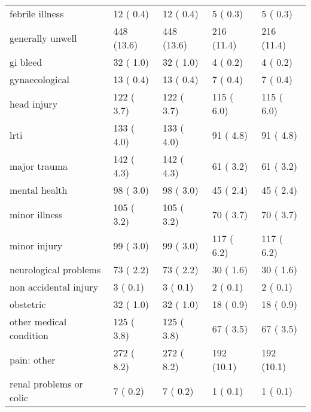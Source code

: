 \documentclass[
  a4paper,
  openany]{article}
\begin{document}
\begin{longtable}[t]{lllll}
\hspace{1em}febrile illness & 12 ( 0.4) & 12 ( 0.4) & 5 ( 0.3) & 5 ( 0.3)\\
\rowcolor{gray!6}  \hspace{1em}generally unwell & 448 (13.6) & 448 (13.6) & 216 (11.4) & 216 (11.4)\\
\hspace{1em}gi bleed & 32 ( 1.0) & 32 ( 1.0) & 4 ( 0.2) & 4 ( 0.2)\\
\rowcolor{gray!6}  \hspace{1em}gynaecological & 13 ( 0.4) & 13 ( 0.4) & 7 ( 0.4) & 7 ( 0.4)\\
\hspace{1em}head injury & 122 ( 3.7) & 122 ( 3.7) & 115 ( 6.0) & 115 ( 6.0)\\
\rowcolor{gray!6}  \hspace{1em}lrti & 133 ( 4.0) & 133 ( 4.0) & 91 ( 4.8) & 91 ( 4.8)\\
\hspace{1em}major trauma & 142 ( 4.3) & 142 ( 4.3) & 61 ( 3.2) & 61 ( 3.2)\\
\rowcolor{gray!6}  \hspace{1em}mental health & 98 ( 3.0) & 98 ( 3.0) & 45 ( 2.4) & 45 ( 2.4)\\
\hspace{1em}minor illness & 105 ( 3.2) & 105 ( 3.2) & 70 ( 3.7) & 70 ( 3.7)\\
\rowcolor{gray!6}  \hspace{1em}minor injury & 99 ( 3.0) & 99 ( 3.0) & 117 ( 6.2) & 117 ( 6.2)\\
\hspace{1em}neurological problems & 73 ( 2.2) & 73 ( 2.2) & 30 ( 1.6) & 30 ( 1.6)\\
\rowcolor{gray!6}  \hspace{1em}non accidental injury & 3 ( 0.1) & 3 ( 0.1) & 2 ( 0.1) & 2 ( 0.1)\\
\hspace{1em}obstetric & 32 ( 1.0) & 32 ( 1.0) & 18 ( 0.9) & 18 ( 0.9)\\
\rowcolor{gray!6}  \hspace{1em}other medical condition & 125 ( 3.8) & 125 ( 3.8) & 67 ( 3.5) & 67 ( 3.5)\\
\hspace{1em}pain: other & 272 ( 8.2) & 272 ( 8.2) & 192 (10.1) & 192 (10.1)\\
\rowcolor{gray!6}  \hspace{1em}renal problems or colic & 7 ( 0.2) & 7 ( 0.2) & 1 ( 0.1) & 1 ( 0.1)\\

\end{longtable}
\end{document}
